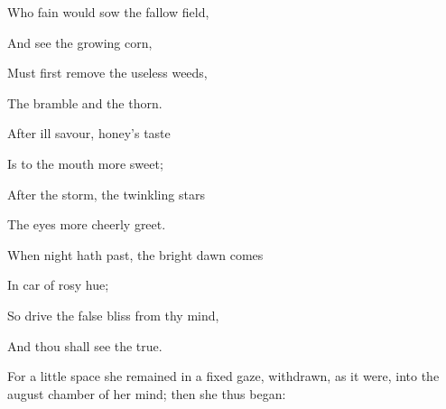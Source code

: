
Who fain would sow the fallow field,

And see the growing corn,

Must first remove the useless weeds,

The bramble and the thorn.

After ill savour, honey's taste

Is to the mouth more sweet;

After the storm, the twinkling stars

The eyes more cheerly greet.

When night hath past, the bright dawn comes

In car of rosy hue;

So drive the false bliss from thy mind,

And thou shall see the true.


For a little space she remained in a fixed gaze, withdrawn, as it were,
into the august chamber of her mind; then she thus began:

